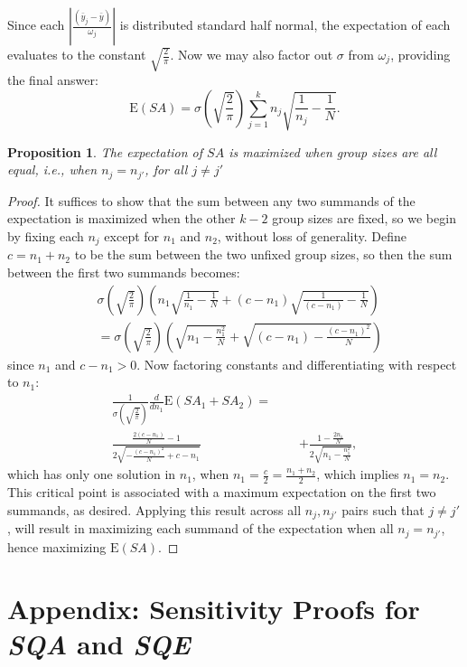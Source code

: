 \documentclass[USenglish,oneside]{article}
\newcounter{ab}
\newcounter{ar}
\newcommand{\sqa}{\textit{SQA}\xspace}
\newcommand{\sqe}{\textit{SQE}\xspace}
\newcommand{\E}{\text{E}}
\newcommand{\yj}{\bar{y}_j}
\newcommand{\yb}{\bar y}
\newtheorem{prop}{Proposition}
\begin{document}
Since each $|\frac{(\yj - \yb)}{\omega_j}|$ is distributed standard half normal, the expectation of each evaluates to the constant $\sqrt{\frac{2}{\pi}}$. Now we may also factor out $\sigma$ from $\omega_j$, providing the final answer:
\begin{equation*}
    \E(SA) = \sigma(\sqrt{\frac{2}{\pi}})\sum_{j=1}^kn_j\sqrt{\frac{1}{n_j} - \frac{1}{N}}.
\end{equation*}

\begin{prop}
The expectation of $SA$ is maximized when group sizes are all equal, i.e., when $n_j = n_{j'}$, for all $j \neq j'$
\end{prop}

\begin{proof}
It suffices to show that the sum between any two summands of the expectation is maximized when the other $k-2$ group sizes are fixed, so we begin by fixing each $n_j$ except for $n_1$ and $n_2$, without loss of generality. Define $c = n_1 + n_2$ to be the sum between the two unfixed group sizes, so then the sum between the first two summands becomes:
\begin{align*}
&\sigma(\sqrt{\frac{2}{\pi}})(n_1\sqrt{\frac{1}{n_1} - \frac{1}{N}} + (c-n_1)\sqrt{\frac{1}{(c-n_1)} - \frac{1}{N}}) \\
&=\sigma(\sqrt{\frac{2}{\pi}})(\sqrt{n_1 - \frac{n_1^2}{N}} + \sqrt{(c-n_1) - \frac{(c-n_1)^2}{N}})
\end{align*}
since $n_1$ and $c-n_1 > 0$. Now factoring constants and differentiating with respect to $n_1$:
\begin{align*}
\frac{1}{\sigma(\sqrt{\frac{2}{\pi}})}\frac{d}{dn_1}\E(SA_1 \!+\! SA_2) =~~~~~~&\\
 \frac{\frac{2 (c-n_1)}{N}-1}{2 \sqrt{-\frac{(c-n_1)^2}{N}+c-n_1}}&+\frac{1-\frac{2 n_1}{N}}{2 \sqrt{n_1-\frac{n_1^2}{N}}},
\end{align*}
which has only one solution in $n_1$, when $n_1 = \frac{c}{2} =  \frac{n_1 + n_2}{2}$, which implies $n_1 = n_2$. This critical point is associated with a maximum expectation on the first two summands, as desired. Applying this result across all $n_j, n_{j'}$ pairs such that $j \neq j'$, will result in maximizing each summand of the expectation when all $n_j = n_{j'}$, hence maximizing $\E(SA)$.
\end{proof}


\section{Appendix: Sensitivity Proofs for \sqa and \sqe}\label{sec:fqsensitivity}
\end{document}
